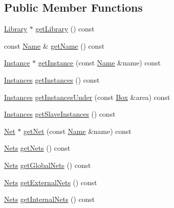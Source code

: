 \subsection*{Public Member Functions}
\begin{DoxyCompactItemize}
\item 
\hyperlink{classHurricane_1_1Library}{Library} $\ast$ \hyperlink{classHurricane_1_1Cell_aa84b97773160a28d3dd69df1e261eecf}{get\+Library} () const
\item 
const \hyperlink{classHurricane_1_1Name}{Name} \& \hyperlink{classHurricane_1_1Cell_a01cd4bba972d484496fd297648b8fa0c}{get\+Name} () const
\item 
\hyperlink{classHurricane_1_1Instance}{Instance} $\ast$ \hyperlink{classHurricane_1_1Cell_abaf178b24734de37cf0ac31918c096ac}{get\+Instance} (const \hyperlink{classHurricane_1_1Name}{Name} \&name) const
\item 
\hyperlink{namespaceHurricane_ac9436b03a2926f34ad6863deae2baadc}{Instances} \hyperlink{classHurricane_1_1Cell_aa85b3992431b672827167c5d9cb622f2}{get\+Instances} () const
\item 
\hyperlink{namespaceHurricane_ac9436b03a2926f34ad6863deae2baadc}{Instances} \hyperlink{classHurricane_1_1Cell_a5eb16d9d0f340ad71b81d794f6f8525f}{get\+Instances\+Under} (const \hyperlink{classHurricane_1_1Box}{Box} \&area) const
\item 
\hyperlink{namespaceHurricane_ac9436b03a2926f34ad6863deae2baadc}{Instances} \hyperlink{classHurricane_1_1Cell_a7e51bee5db73dd44f788e591a5c175c8}{get\+Slave\+Instances} () const
\item 
\hyperlink{classHurricane_1_1Net}{Net} $\ast$ \hyperlink{classHurricane_1_1Cell_a63cb19881279b5af0a4e7dae707ef1bd}{get\+Net} (const \hyperlink{classHurricane_1_1Name}{Name} \&name) const
\item 
\hyperlink{namespaceHurricane_a3404a8b17130a1824f4a281704b04df7}{Nets} \hyperlink{classHurricane_1_1Cell_a8b4728abe83e9ec21d7bee1154218279}{get\+Nets} () const
\item 
\hyperlink{namespaceHurricane_a3404a8b17130a1824f4a281704b04df7}{Nets} \hyperlink{classHurricane_1_1Cell_a1512722d821edc18ff38e673862cd108}{get\+Global\+Nets} () const
\item 
\hyperlink{namespaceHurricane_a3404a8b17130a1824f4a281704b04df7}{Nets} \hyperlink{classHurricane_1_1Cell_aa80f3345db8c1395fa04a50737208793}{get\+External\+Nets} () const
\item 
\hyperlink{namespaceHurricane_a3404a8b17130a1824f4a281704b04df7}{Nets} \hyperlink{classHurricane_1_1Cell_a0da980d28ad60334da94a3966338f873}{get\+Internal\+Nets} () const

\end{DoxyCompactItemize}
